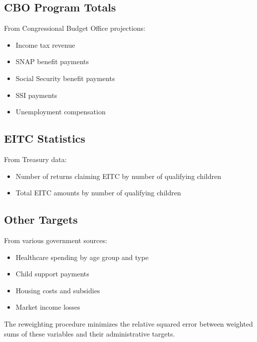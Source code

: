 \subsection{CBO Program Totals}

From Congressional Budget Office projections:
\begin{itemize}
    \item Income tax revenue
    \item SNAP benefit payments
    \item Social Security benefit payments
    \item SSI payments
    \item Unemployment compensation
\end{itemize}

\subsection{EITC Statistics}

From Treasury data:
\begin{itemize}
    \item Number of returns claiming EITC by number of qualifying children
    \item Total EITC amounts by number of qualifying children
\end{itemize}

\subsection{Other Targets}

From various government sources:
\begin{itemize}
    \item Healthcare spending by age group and type
    \item Child support payments
    \item Housing costs and subsidies
    \item Market income losses
\end{itemize}

The reweighting procedure minimizes the relative squared error between weighted sums of these variables and their administrative targets. 

